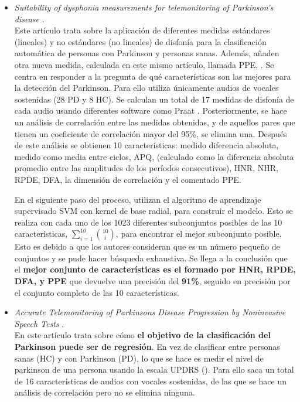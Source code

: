 \begin{itemize}
	\item \textit{Suitability of dysphonia measurements for telemonitoring of Parkinson’s disease} \cite{MxLtSuitability}.\\
	Este artículo trata sobre la aplicación de diferentes medidas estándares (lineales) y no estándares (no lineales) de disfonía para la clasificación automática de personas con Parkinson y personas sanas. Además, añaden otra nueva medida, calculada en este mismo artículo, llamada PPE, . Se centra en responder a la pregunta de qué características son las mejores para la detección del Parkinson. Para ello utiliza únicamente audios de vocales sostenidas (28 PD y 8 HC). Se calculan un total de 17 medidas de disfonía de cada audio usando diferentes software como Praat \cite{praat}. Posteriormente, se hace un análisis de correlación entre las medidas obtenidas, y de aquellos pares que tienen un coeficiente de correlación mayor del 95\%, se elimina una. Después de este análisis se obtienen 10 características:  medido diferencia absoluta,  medido como media entre ciclos, APQ,  (calculado como la diferencia absoluta promedio entre las amplitudes de los períodos consecutivos), HNR, NHR, RPDE, DFA, la dimensión de correlación y el comentado PPE.
	
	 En el siguiente paso del proceso, utilizan el algoritmo de aprendizaje supervisado SVM con kernel de base radial, para construir el modelo. Esto se realiza con cada uno de los 1023 diferentes subconjuntos posibles de las 10 características, $\sum_{i=1}^{10} \binom{10}{i}$, para encontrar el mejor subconjunto posible. Esto es debido a que los autores consideran que es un número pequeño de conjuntos y se pude hacer búsqueda exhaustiva. Se llega a la conclusión que el \textbf{mejor conjunto de características es el formado por HNR, RPDE, DFA, y PPE} que devuelve una precisión del \textbf{91\%}, seguido en precisión por el conjunto completo de las 10 características.
	
	\item \textit{Accurate Telemonitoring of Parkinsons Disease Progression by Noninvasive Speech Tests} \cite{MxLtAccurate}.\\
	En este artículo trata sobre cómo \textbf{el objetivo de la clasificación del Parkinson puede ser de regresión}. En vez de clasificar entre personas sanas (HC) y con Parkinson (PD), lo que se hace es medir el nivel de parkinson de una persona usando la escala UPDRS (). Para ello saca un total de 16 características de audios con vocales sostenidas, de las que se hace un análisis de correlación pero no se elimina ninguna.
	

\end{itemize}
